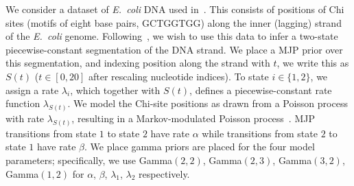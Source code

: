 {\begin{figure}
\begin{minipage}[!hp]{.7\linewidth}
    \vspace{-.2in}
  \end{minipage}
    \vspace{-.3in}
  \end{figure}
  We consider a dataset of {\em E.\ coli} DNA used in~\cite{FearnSher2006}.
  This consists of positions of Chi sites (motifs of eight base pairs, 
  GCTGGTGG) along the inner (lagging) strand of the {\em E.\ coli} genome. 
  Following~\cite{FearnSher2006}, we wish to use this data to infer a 
  two-state piecewise-constant segmentation of the DNA strand. We place a 
  MJP prior over this segmentation, and indexing position along the 
  strand with $t$, we write this as $S(t)$ ($t \in [0,20]$ after rescaling 
  nucleotide indices). To state $i \in 
  \{1,2\}$, we assign a rate $\lambda_i$, which together with $S(t)$, 
  defines a piecewise-constant rate function $\lambda_{S(t)}$. We model 
  the Chi-site positions as drawn from a Poisson process with rate 
  $\lambda_{S(t)}$, resulting in a {Markov-modulated Poisson 
  process}~\cite{scottmmpp03}. 
  MJP transitions from state $1$ to state $2$ have rate $\alpha$ while 
  transitions from state $2$ to state $1$ have rate $\beta$. We place 
  gamma priors are placed for the four model parameters; specifically, 
  we use Gamma$(2,2)$, Gamma$(2,3)$, Gamma$(3,2)$, Gamma$(1,2)$ for 
  $\alpha$, $\beta$, $\lambda_1$, $\lambda_2$ respectively.

}
